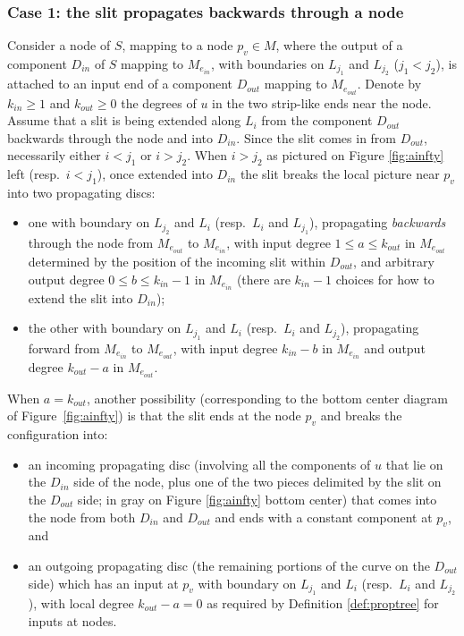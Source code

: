 \documentclass[11pt,leqno]{amsart}
\numberwithin{equation}{section}
\begin{document}
\subsubsection*{Case 1: the slit propagates backwards through a node}
Consider a node of $S$, mapping to a node $p_v\in M$, where the output 
of a component $D_{in}$ of $S$ mapping to $M_{e_{in}}$, with
boundaries on $L_{j_1}$ and $L_{j_2}$ ($j_1<j_2$), is attached to an
input end of a component $D_{out}$ mapping to $M_{e_{out}}$. Denote by $k_{in}\geq 1$ and
$k_{out}\geq 0$ the degrees of $u$ in the two strip-like ends near the node.
Assume that a slit is being extended along $L_i$ from the component $D_{out}$
backwards through the node and into $D_{in}$. Since the slit comes in from
$D_{out}$, necessarily either $i<j_1$ or $i>j_2$. When $i>j_2$ as pictured
on Figure \ref{fig:ainfty} left (resp.\ $i<j_1$), once extended into $D_{in}$ the slit breaks the local picture 
near $p_v$ into two propagating discs:
\begin{itemize}
\item one with boundary on $L_{j_2}$
and $L_i$ (resp.\ $L_i$ and $L_{j_1}$), propagating {\em backwards} through the node from $M_{e_{out}}$
to $M_{e_{in}}$, with input degree $1\leq a\leq k_{out}$ in $M_{e_{out}}$
determined by the position of the incoming slit within $D_{out}$, and arbitrary output degree $0\leq
b\leq k_{in}-1$ in $M_{e_{in}}$ (there are $k_{in}-1$ choices for how to
extend the slit into $D_{in}$);
\item the other with boundary on $L_{j_1}$ and $L_i$ (resp.\ $L_i$ and $L_{j_2}$), propagating forward
from $M_{e_{in}}$ to $M_{e_{out}}$, with input degree $k_{in}-b$ in
$M_{e_{in}}$ and output degree $k_{out}-a$ in $M_{e_{out}}$.
\end{itemize}
When $a=k_{out}$, another possibility (corresponding to the bottom center diagram of
Figure~\ref{fig:ainfty}) is that the slit ends at
the node $p_v$ and breaks the configuration into:
\begin{itemize}
\item an incoming propagating disc
(involving all the components of $u$ that lie on the $D_{in}$ side of the
node, plus one of the two pieces delimited by the slit on the $D_{out}$
side; in gray on Figure \ref{fig:ainfty} bottom center) 
that comes into the node from both $D_{in}$ and $D_{out}$ and ends with a 
constant component at $p_v$, and 
\item an outgoing propagating disc (the remaining portions of the curve on
the $D_{out}$ side) which
has an input at $p_v$ with boundary on $L_{j_1}$ and $L_i$ (resp.\ $L_i$ and
$L_{j_2}$), with local
degree $k_{out}-a=0$ as required by Definition \ref{def:proptree} for inputs at nodes.
\end{itemize}
\end{document}
